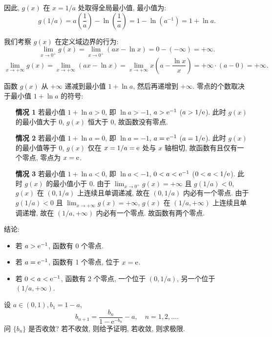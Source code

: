 \begin{solution}
\begin{enumerate}
              因此, $g(x)$ 在 $x = 1/a$ 处取得全局最小值, 最小值为:
              $$ g(1/a) = a\left(\frac{1}{a}\right) - \ln\left(\frac{1}{a}\right) = 1 - \ln(a^{-1}) = 1 + \ln a. $$

              我们考察 $g(x)$ 在定义域边界的行为:
              $$ \lim_{x \to 0^+} g(x) = \lim_{x \to 0^+} (ax - \ln x) = 0 - (-\infty) = +\infty. $$
              $$ \lim_{x \to +\infty} g(x) = \lim_{x \to +\infty} (ax - \ln x) = \lim_{x \to +\infty} x \left(a - \frac{\ln x}{x}\right) = +\infty \cdot (a - 0) = +\infty. $$

              函数 $g(x)$ 从 $+\infty$ 递减到最小值 $1+\ln a$, 然后再递增到 $+\infty$. 零点的个数取决于最小值 $1+\ln a$ 的符号:

              \begin{enumerate}
                  \item[\textbf{情况 1}] 若最小值 $1 + \ln a > 0$, 即 $\ln a > -1$, $a > \mathrm{e}^{-1}$ ($a > 1/\mathrm{e}$).
                      此时 $g(x)$ 的最小值大于 0, $g(x)$ 恒大于 0, 故函数没有零点.

                  \item[\textbf{情况 2}] 若最小值 $1 + \ln a = 0$, 即 $\ln a = -1$, $a = \mathrm{e}^{-1}$ ($a = 1/\mathrm{e}$).
                      此时 $g(x)$ 的最小值等于 0, $g(x)$ 仅在 $x=1/a = \mathrm{e}$ 处与 $x$ 轴相切, 故函数有且仅有一个零点, 零点为 $x=\mathrm{e}$.

                  \item[\textbf{情况 3}] 若最小值 $1 + \ln a < 0$, 即 $\ln a < -1$, $0 < a < \mathrm{e}^{-1}$ ($0 < a < 1/\mathrm{e}$).
                      此时 $g(x)$ 的最小值小于 0.
                      由于 $\lim_{x \to 0^+} g(x) = +\infty$ 且 $g(1/a) < 0$, $g(x)$ 在 $(0, 1/a)$ 上连续且单调递减, 故在 $(0, 1/a)$ 内必有一个零点.
                      由于 $g(1/a) < 0$ 且 $\lim_{x \to +\infty} g(x) = +\infty$, $g(x)$ 在 $(1/a, +\infty)$ 上连续且单调递增, 故在 $(1/a, +\infty)$ 内必有一个零点.
                      故函数有两个零点.
              \end{enumerate}

              结论:
              \begin{itemize}
                  \item 若 $a > \mathrm{e}^{-1}$, 函数有 0 个零点.
                  \item 若 $a = \mathrm{e}^{-1}$, 函数有 1 个零点, 位于 $x = \mathrm{e}$.
                  \item 若 $0 < a < \mathrm{e}^{-1}$, 函数有 2 个零点, 一个位于 $(0, 1/a)$, 另一个位于 $(1/a, +\infty)$.
              \end{itemize}

    \end{enumerate}
\end{solution}

\begin{exercise}[3.3.25]
    设 $a \in (0,1), b_1=1-a$,
    $$ b_{n+1} = \frac{b_n}{1-\mathrm{e}^{-b_n}} - a, \quad n=1,2,\dots. $$
    问 $\{b_n\}$ 是否收敛? 若不收敛, 则给予证明, 若收敛, 则求极限.
\end{exercise}

\newpage
